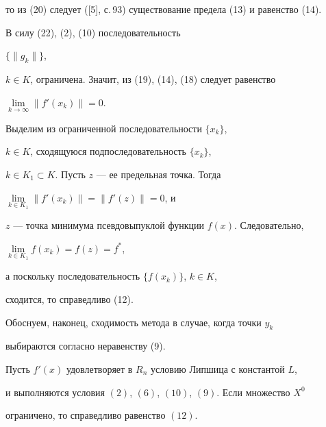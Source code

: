 \begin{pf}
то из (20) следует ([5], с.\,93) существование предела (13) и равенство (14).


В силу (22), (2), (10) последовательность


$\{\|g_k\|\}$,


$k\in K$, ограничена. Значит, из (19), (14), (18) следует равенство


$\lim\limits_{k\to \infty }\|f'(x_k)\| =0$.


Выделим из ограниченной последовательности $\{x_k\}$,


$k\in K$, сходящуюся подпоследовательность $\{x_k\}$,


$k\in K_1\subset K$. Пусть $z$ --- ее предельная точка. Тогда


$\lim\limits_{k\in K_1}\|f'(x_k)\|=\|f'(z)\|=0$, и 


$z$ --- точка минимума псевдовыпуклой функции $f(x)$. Следовательно,


$\lim\limits_{k\in K_1}f(x_k)=f(z)=f^{*}$,


а поскольку последовательность $\{f(x_k)\}$, $k\in K$, 


сходится, то справедливо (12).


\end{pf}





Обоснуем, наконец, сходимость метода в случае, когда точки $y_k$


выбираются согласно неравенству (9).





\begin{thm}


Пусть ${f}'(x)$ удовлетворяет в $R_n$ условию Липшица с константой $L$,


и выполняются условия $(2)$, $(6)$, $(10)$, $(9)$. Если множество $X^0$


ограничено, то справедливо равенство $(12)$.


\end{thm}





